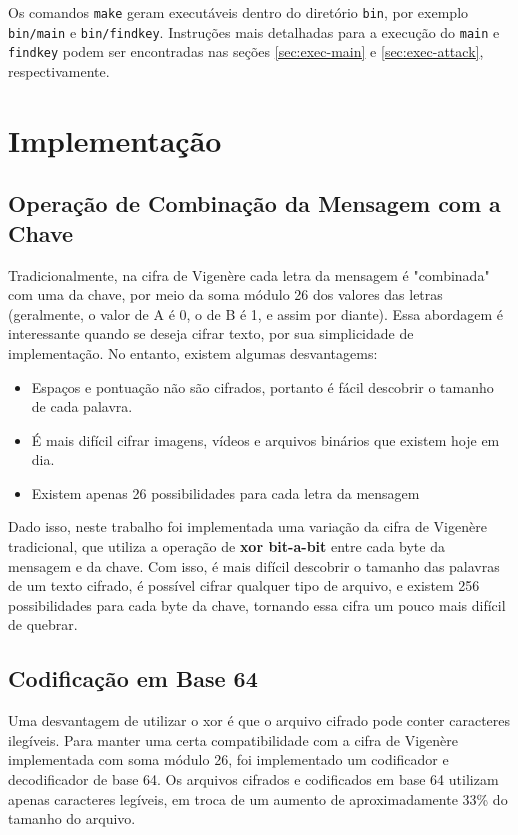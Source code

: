 \documentclass[conference]{IEEEtran}
\begin{document}
Os comandos \verb|make| geram executáveis dentro do diretório \verb|bin|, por
exemplo \verb|bin/main| e \verb|bin/findkey|. Instruções mais detalhadas para a
execução do \verb|main| e \verb|findkey| podem ser encontradas nas seções
\ref{sec:exec-main} e \ref{sec:exec-attack}, respectivamente.  

\section{Implementação} %
\label{sec:implementation}

\subsection{Operação de Combinação da Mensagem com a Chave}
Tradicionalmente, na cifra de Vigenère cada letra da mensagem é "combinada" com
uma da chave, por meio da soma módulo 26 dos valores das letras (geralmente, o
valor de A é 0, o de B é 1, e assim por diante). Essa abordagem é interessante
quando se deseja cifrar texto, por sua simplicidade de implementação. No
entanto, existem algumas desvantagems:

\begin{itemize}
    \item Espaços e pontuação não são cifrados, portanto é fácil descobrir o tamanho de cada
        palavra.
    \item É mais difícil cifrar imagens, vídeos e arquivos binários que existem
        hoje em dia.
    \item Existem apenas 26 possibilidades para cada letra da mensagem
\end{itemize}

Dado isso, neste trabalho foi implementada uma variação da cifra de Vigenère
tradicional, que utiliza a operação de \textbf{xor bit-a-bit} entre cada byte da mensagem
e da chave. Com isso, é mais difícil descobrir o tamanho das palavras de um
texto cifrado, é possível cifrar qualquer tipo de arquivo, e existem 256
possibilidades para cada byte da chave, tornando essa cifra um pouco mais
difícil de quebrar.

\subsection{Codificação em Base 64}
\label{sec:base64}
Uma desvantagem de utilizar o xor é que o arquivo cifrado pode conter caracteres
ilegíveis. Para manter uma certa compatibilidade com a cifra de Vigenère
implementada com soma módulo 26, foi implementado um codificador e decodificador
de base 64. Os arquivos cifrados e codificados em base 64 utilizam apenas
caracteres legíveis, em troca de um aumento de aproximadamente 33\% do tamanho
do arquivo.
\end{document}
